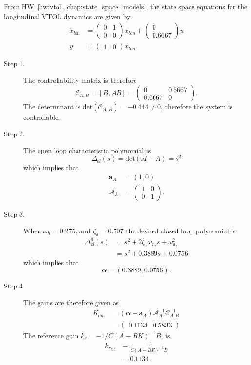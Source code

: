 From HW~\ref{hw:vtol}.\ref{chap:state_space_models}, the state space equations for the longitudinal VTOL dynamics are given by
\begin{align*}
\dot{x}_{lon} &= \begin{pmatrix}
         0 &        1  \\
         0 &        0 
\end{pmatrix} x_{lon} + \begin{pmatrix}
         0 \\
         0.6667
\end{pmatrix} u \\
y &= \begin{pmatrix}
1 & 0  
\end{pmatrix} x_{lon}.
\end{align*}
\begin{description}
\item[Step 1.] 
The controllability matrix is therefore
\[
\mathcal{C}_{A,B} = [B, AB] = \begin{pmatrix}           
         0 &   0.6667 \\
    0.6667 &        0 \end{pmatrix}.
\]
The determinant is $\text{det}(\mathcal{C}_{A,B})=-0.444\neq 0$, therefore the system is controllable.  
\item[Step 2.] The open loop characteristic polynomial is
\[
\Delta_{ol}(s)=\text{det}(sI-A) = s^2
\]
which implies that
\begin{align*}
\mathbf{a}_A &= (1, 0) \\
\mathcal{A}_A &= \begin{pmatrix}           
         1 &   0 \\
         0 &  1 \end{pmatrix}.
\end{align*}

\item[Step 3.] When $\omega_h = 0.275$, and $\zeta_h = 0.707$ the desired closed loop polynomial is
\begin{align*}
\Delta_{cl}^d(s) &= s^2+2\zeta_{z}\omega_{n_z} s + \omega_{n_z}^2 \\
&= s^2 + 0.3889 s + 0.0756       
\end{align*}
which implies that
\[
\boldsymbol{\alpha} = (0.3889,    0.0756).
\]

\item[Step 4.]
The gains are therefore given as
\begin{align*}
K_{lon} &= (\boldsymbol{\alpha}-\mathbf{a}_A)\mathcal{A}_A^{-1}\mathcal{C}_{A,B}^{-1} \\
  &= \begin{pmatrix} 0.1134 &  0.5833 \end{pmatrix}
\end{align*}
The reference gain $k_r=-1/C(A-BK)^{-1}B$, is
\begin{align*}
k_{r_{lat}} &= \frac{-1}{C(A-BK)^{-1}B} \\
    &= 0.1134.
\end{align*}
\end{description}

